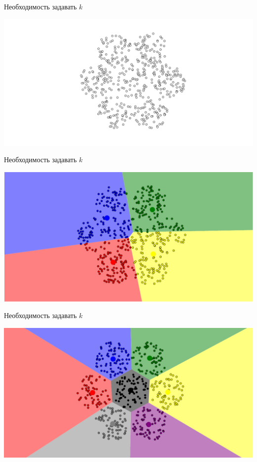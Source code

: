 \documentclass[10pt]{beamer}
\begin{document}
\begin{frame}{Необходимость задавать $k$}
	\begin{center}
	  \includegraphics[width= \textwidth, keepaspectratio = true]{images/k_means_k}  
	\end{center}
\end{frame}

\begin{frame}{Необходимость задавать $k$}
	\begin{center}
	  \includegraphics[width= \textwidth, keepaspectratio = true]{images/k_means_k4}  
	\end{center}
\end{frame}

\begin{frame}{Необходимость задавать $k$}
	\begin{center}
	  \includegraphics[width= \textwidth, keepaspectratio = true]{images/k_means_k7}  
	\end{center}
\end{frame}
\end{document}

